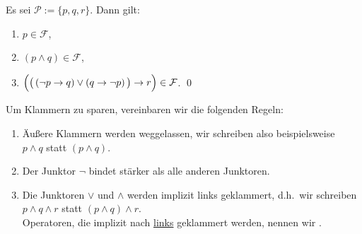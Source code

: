\example 
Es sei $\mathcal{P} := \{ p, q, r \}$. Dann gilt:
\begin{enumerate}
\item $p \in \mathcal{F}$,
\item $(p \wedge q) \in \mathcal{F}$,
\item $\Bigl(\bigl(\,(\neg p \rightarrow q) \vee (q \rightarrow \neg p)\,\bigr) \rightarrow r\Bigr) \in \mathcal{F}$.  \qed
\end{enumerate}

\noindent
Um Klammern zu sparen, vereinbaren wir die folgenden Regeln:
\begin{enumerate}
\item Äußere Klammern werden weggelassen, wir schreiben also beispielsweise \\[0.2cm]
      \hspace*{1.3cm} $p \wedge q$ \quad statt \quad $(p \wedge q)$.
\item Der Junktor $\neg$ bindet stärker als alle anderen Junktoren.
\item Die Junktoren  $\vee$ und $\wedge$ werden implizit links geklammert, d.h.~wir
      schreiben 
      \\[0.2cm]
      \hspace*{1.3cm} $p \wedge q \wedge r$ \quad statt \quad $(p \wedge q) \wedge r$.
      \\[0.2cm]
      Operatoren, die implizit nach \underline{links} geklammert werden, nennen wir
      . 


\end{enumerate}
